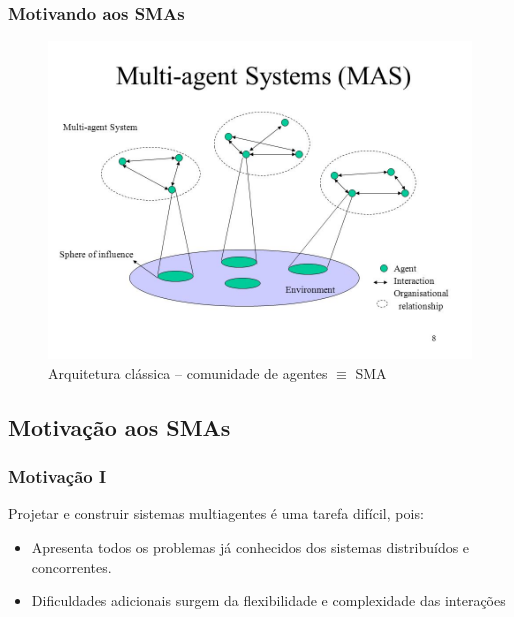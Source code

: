 \begin{frame}

  \frametitle{Motivando aos SMAs}

\begin{figure}[!ht]
\centering
\includegraphics[height =.6\textheight,width=.7\textwidth]{figuras/agentes_vizinhos03.jpeg}
\caption{Arquitetura clássica -- comunidade de agentes $\equiv $   SMA}
\end{figure}
 
\end{frame}


\subsection{Motivação aos SMAs}
\begin{frame} [allowframebreaks=0.9]

    \frametitle{Motivação I}
    Projetar e construir sistemas multiagentes é uma tarefa difícil, pois:
    \begin{itemize}
    \pause
      \item Apresenta todos os problemas já conhecidos 
dos sistemas distribuídos e concorrentes.
\pause
      \item Dificuldades adicionais surgem da flexibilidade 
e complexidade das interações
    
    \end{itemize}
\end{frame}



